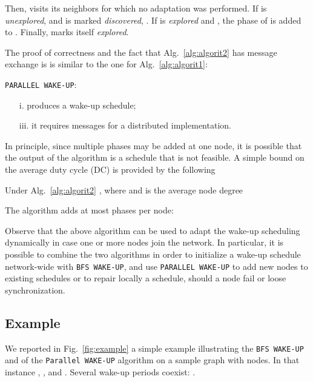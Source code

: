 Then,  visits its neighbors for which no adaptation was performed. If  is {\em unexplored},  and  is marked {\em discovered}, 
. If  is {\em explored} and , the phase of  is added to . Finally,  marks 
itself {\em explored}.

The proof of correctness and the fact that Alg.~\ref{alg:algorit2} has message exchange 
is  is similar to the one for Alg.~\ref{alg:algorit1}:
\begin{thm}
{\tt PARALLEL WAKE-UP}:
\begin{enumerate}
\item[  i.] produces a wake-up schedule; 
\item[iii.] it requires  messages for a distributed implementation.
\end{enumerate}
\end{thm}

In principle, since multiple phases may be added at one node, it is possible that 
the output of the algorithm is a schedule that is not feasible. A simple bound on 
the average duty cycle (DC) is provided by the following
\begin{thm}
Under Alg.~\ref{alg:algorit2} , where  and  is the average node degree
\end{thm}
\proof
The algorithm adds at most  phases per node: 
\endproof


\begin{rem}
Observe that the above algorithm can be used to adapt the wake-up scheduling dynamically in case one or more nodes 
join the network. In particular, it is possible to combine the two algorithms in order to initialize a 
wake-up schedule network-wide with {\tt BFS WAKE-UP}, and use {\tt PARALLEL WAKE-UP} to add new nodes to existing schedules
 or to repair locally a schedule, should a node fail or loose synchronization.
\end{rem}


\subsection{Example}


We reported in Fig.~\ref{fig:example} a simple example 
illustrating the {\tt BFS WAKE-UP} and of the {\tt Parallel WAKE-UP} 
algorithm on a sample graph with  
nodes. In that instance , , 
 and . Several 
wake-up periods coexist: .

